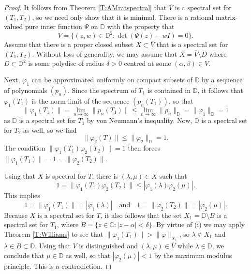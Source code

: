 \documentclass[10pt,a4paper]{amsart}
\newcommand{\bC}{{\mathbb{C}}}
\newcommand{\bD}{{\mathbb{D}}}
\newcommand{\ol}{\overline}
\newcommand{\qand}{\quad\text{and}\quad}
\renewcommand{\phi}{\varphi}
\begin{document}
\begin{proof}
It follows from Theorem \ref{T:AMratspectral} that $\ol{V}$ is a spectral set for $(T_1,T_2)$, so we need only show that it is minimal. There is a  rational matrix-valued pure inner function $\Psi$ on $\bD$ with the property that
\[
V=\{(z,w)\in \bD^2:\det(\Psi(z)-wI)=0\}.
\]
Assume that there is a proper closed subset $X\subset \ol{V}$ that is  a spectral set for $(T_1,T_2)$. 
Without loss of generality, we may assume that $X=\ol{V}\setminus D$ where $D\subset \bD^2$ is some polydisc of radius $\delta>0$ centred at some $(\alpha,\beta)\in V$. 


Next, $\phi_1$ can be approximated uniformly on compact subsets of $\bD$ by a sequence of polynomials $(p_n)$. Since the spectrum of $T_1$ is contained in $\bD$, it follows that $\phi_1(T_1)$ is the norm-limit of the sequence $(p_n(T_1))$, so that
\[
\|\phi_1(T_1)\|=\lim_{n\to \infty} \|p_n(T_1)\|\leq \lim_{n\to \infty} \|p_n\|_{\bD}=\|\phi_1\|_{\bD}=1
\]
as $\ol{\bD}$ is a spectral set for $T_1$ by von Neumann's inequality. Now, $\ol{\bD}$ is a spectral set for $T_2$ as well, so we find
\[
\|\phi_2(T)\|\leq \|\phi_2\|_{\bD}=1.
\]
The condition $\|\phi_1(T_1)\phi_2(T_2)\|=1$ then forces $\|\phi_1(T_1)\|=1=\|\phi_2(T_2)\|$.

Using that $X$ is spectral for $T$, there is $(\lambda,\mu)\in X$ such that
\[
1=\|\phi_1(T_1)\phi_2(T_2)\|\leq |\phi_1(\lambda)\phi_2(\mu)|.
\]
This implies 
\[
1=\|\phi_1(T_1)\|=|\phi_1(\lambda)| \qand 1=\|\phi_2(T_2)\|=|\phi_2(\mu)|.
\]
Because $X$ is a spectral set for $T$, it also follows that the set $X_1=\ol{\bD}\setminus B$ is a spectral set for $T_1$, where $B=\{z\in \bC:|z-\alpha|<\delta\}$.  By virtue of (i) we may apply Theorem \ref{T:Williams}  to see that  $\|\phi_1(T_1)\|>\|\phi\|_{X_1}$, so $\lambda\notin X_1$ and $\lambda\in B\subset \bD$. Using that $V$ is distinguished and $(\lambda, \mu)\in \ol{V}$ while $\lambda\in \bD$, we conclude that $\mu\in \bD$ as well,  so that $|\phi_2(\mu)|<1$ by the maximum modulus principle. This is a contradiction.
\end{proof}
\end{document}
